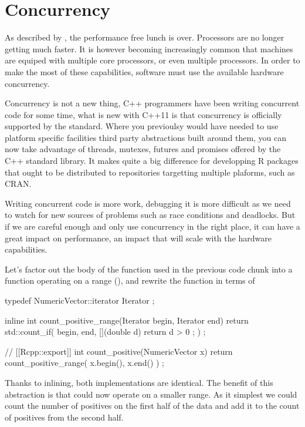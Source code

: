 \section{Concurrency}

As described by \citep{sutter2005}, the performance free lunch is over. Processors
are no longer getting much faster. It is however becoming 
increasingly common that machines are equiped with multiple core processors, or
even multiple processors. In order to make the most of these
capabilities, software must use the available hardware concurrency. 

Concurrency is not a new thing, C++ programmers have been writing concurrent
code for some time, what is new with C++11 is that concurrency 
is officially supported by the standard. Where you previoulsy 
would have needed to use platform specific facilities 
third party abstractions built around them, you can now take advantage
of threads, mutexes, futures and promises offered by the C++ standard 
library. It makes quite a big difference for developping 
R packages that ought to be distributed to repositories targetting 
multiple plaforms, such as CRAN. 

Writing concurrent code is more work, debugging it is more difficult as we need
to watch for new sources of problems such as race conditions and deadlocks. But 
if we are careful enough and only use concurrency in the right place, it can 
have a great impact on performance, an impact that will scale with the
hardware capabilities. 

Let's factor out the body of the function used in the previous code chunk
into a function operating on a range (), 
and rewrite the  function in terms of 

\begin{example}
typedef NumericVector::iterator Iterator ;

inline int count_positive_range(Iterator begin, Iterator end){
  return std::count_if( begin, end, 
    [](double d){ return d > 0 ;}
  ) ;
}

// [[Rcpp::export]]
int count_positive(NumericVector x){
  return count_positive_range( x.begin(), x.end() ) ;
}
\end{example}

Thanks to inlining, both implementations are identical. The benefit of 
this abstraction is that  could now 
operate on a smaller range. As it simplest we could count the 
number of positives on the first half of the data and add it to 
the count of positives from the second half. 

